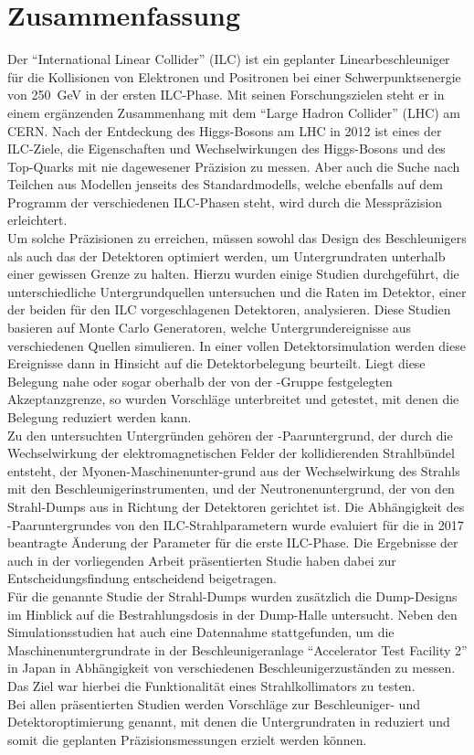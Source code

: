 \chapter*{Zusammenfassung}
Der ``International Linear Collider'' (ILC) ist ein geplanter Linearbeschleuniger f\"ur die Kollisionen von Elektronen und Positronen bei einer Schwerpunktsenergie von \SI{250}{\GeV} in der ersten ILC-Phase.
Mit seinen Forschungszielen steht er in einem erg\"anzenden Zusammenhang mit dem ``Large Hadron Collider'' (LHC) am CERN.
Nach der Entdeckung des Higgs-Bosons am LHC in 2012 ist eines der ILC-Ziele, die Eigenschaften und Wechselwirkungen des Higgs-Bosons und des Top-Quarks mit nie dagewesener Präzision zu messen.
Aber auch die Suche nach Teilchen aus Modellen jenseits des Standardmodells, welche ebenfalls auf dem Programm der verschiedenen ILC-Phasen steht, wird durch die Messpräzision erleichtert.
\\Um solche Präzisionen zu erreichen, m\"ussen sowohl das Design des Beschleunigers als auch das der Detektoren optimiert werden, um Untergrundraten unterhalb einer gewissen Grenze zu halten.
Hierzu wurden einige Studien durchgeführt, die unterschiedliche Untergrundquellen untersuchen und die Raten im \sid Detektor, einer der beiden f\"ur den ILC vorgeschlagenen Detektoren, analysieren.
Diese Studien basieren auf Monte Carlo Generatoren, welche Untergrundereignisse aus verschiedenen Quellen simulieren.
In einer vollen Detektorsimulation werden diese Ereignisse dann in Hinsicht auf die \sid Detektorbelegung beurteilt.
Liegt diese Belegung nahe oder sogar oberhalb der von der \sid-Gruppe festgelegten Akzeptanzgrenze, so wurden Vorschläge unterbreitet und getestet, mit denen die Belegung reduziert werden kann.
\\Zu den untersuchten Untergründen gehören der \positron\electron-Paaruntergrund, der durch die Wechselwirkung der elektromagnetischen Felder der kollidierenden Strahlb\"undel entsteht, der Myonen-Maschinenunter-grund aus der Wechselwirkung des Strahls mit den Beschleunigerinstrumenten, und der Neutronenuntergrund, der von den Strahl-Dumps aus in Richtung der Detektoren gerichtet ist.
Die Abhängigkeit des \positron\electron-Paaruntergrundes von den ILC-Strahlparametern wurde evaluiert f\"ur die in 2017 beantragte Änderung der Parameter f\"ur die erste ILC-Phase.
Die Ergebnisse der auch in der vorliegenden Arbeit präsentierten Studie haben dabei zur Entscheidungsfindung entscheidend beigetragen.
\\F\"ur die genannte Studie der Strahl-Dumps wurden zusätzlich die Dump-Designs im Hinblick auf die Bestrahlungsdosis in der Dump-Halle untersucht.
Neben den Simulationsstudien hat auch eine Datennahme stattgefunden, um die Maschinenuntergrundrate in der Beschleunigeranlage ``Accelerator Test Facility 2'' in Japan in Abhängigkeit von verschiedenen Beschleunigerzust\"anden zu messen.
Das Ziel war hierbei die Funktionalität eines Strahlkollimators zu testen.
\\Bei allen präsentierten Studien werden Vorschläge zur Beschleuniger- und Detektoroptimierung genannt, mit denen die Untergrundraten in \sid reduziert und somit die geplanten Pr\"azisionsmessungen erzielt werden können.